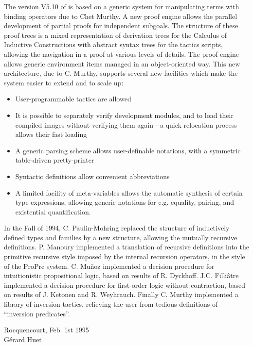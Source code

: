 The version V5.10 of \Coq{} is based on a generic system for
manipulating terms with binding operators due to Chet Murthy. A new
proof engine allows the parallel development of partial proofs for
independent subgoals.  The structure of these proof trees is a mixed
representation of derivation trees for the Calculus of Inductive
Constructions with abstract syntax trees for the tactics scripts,
allowing the navigation in a proof at various levels of details. The
proof engine allows generic environment items managed in an
object-oriented way.  This new architecture, due to C. Murthy,
supports several new facilities which make the system easier to extend
and to scale up:

\begin{itemize}
\item User-programmable tactics are allowed
\item It is possible to separately verify development modules, and to
  load their compiled images without verifying them again - a quick
  relocation process allows their fast loading
\item A generic parsing scheme allows user-definable notations, with a
  symmetric table-driven pretty-printer
\item Syntactic definitions allow convenient abbreviations
\item A limited facility of meta-variables allows the automatic
  synthesis of certain type expressions, allowing generic notations
  for e.g. equality, pairing, and existential quantification.
\end{itemize}

In the Fall of 1994, C. Paulin-Mohring replaced the structure of
inductively defined types and families by a new structure, allowing
the mutually recursive definitions. P. Manoury implemented a
translation of recursive definitions into the primitive recursive
style imposed by the internal recursion operators, in the style of the
ProPre system. C. Mu{\~n}oz implemented a decision procedure for
intuitionistic propositional logic, based on results of R. Dyckhoff.
J.C. Filli{\^a}tre implemented a decision procedure for first-order
logic without contraction, based on results of J. Ketonen and R.
Weyhrauch. Finally C. Murthy implemented a library of inversion
tactics, relieving the user from tedious definitions of ``inversion
predicates''.

\begin{flushright}
Rocquencourt, Feb. 1st 1995\\
Gérard Huet
\end{flushright}

